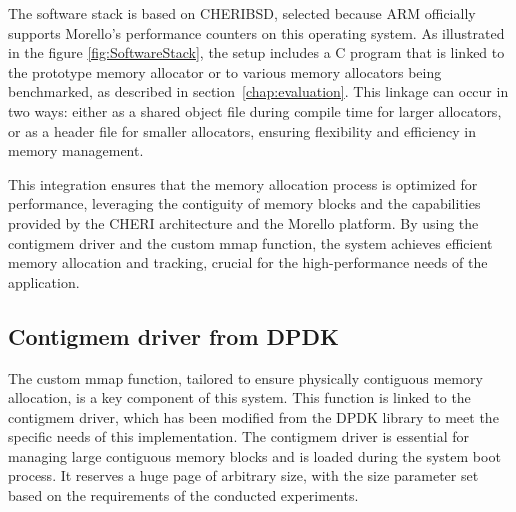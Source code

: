 The software stack is based on CHERIBSD\cite{noauthor_getting_nodate}, selected because ARM officially supports Morello's performance 
counters\cite{noauthor_arm_nodate} on this operating system. As illustrated in the figure \ref{fig:SoftwareStack}, the setup includes a C program that 
is linked to the prototype memory allocator or to various memory allocators being benchmarked, as described 
in section~\ref{chap:evaluation}. This linkage can occur in two ways: either as a shared object file during compile time 
for larger allocators, or as a header file for smaller allocators, ensuring flexibility and efficiency 
in memory management.
\newline

This integration ensures that the memory allocation process is optimized for performance, leveraging the contiguity 
of memory blocks and the capabilities provided by the CHERI architecture and the Morello platform. By using the 
contigmem driver and the custom mmap function, the system achieves efficient memory allocation and tracking, 
crucial for the high-performance needs of the application.

\subsection{Contigmem driver from DPDK}
The custom mmap function, tailored to ensure physically contiguous memory allocation, is a key component 
of this system. This function is linked to the contigmem driver, which has been modified from the DPDK\cite{bi_dpdk-based_2016} library 
to meet the specific needs of this implementation. The contigmem driver is essential for managing large contiguous 
memory blocks and is loaded during the system boot process. It reserves a huge page of arbitrary size, with the 
size parameter set based on the requirements of the conducted experiments.

